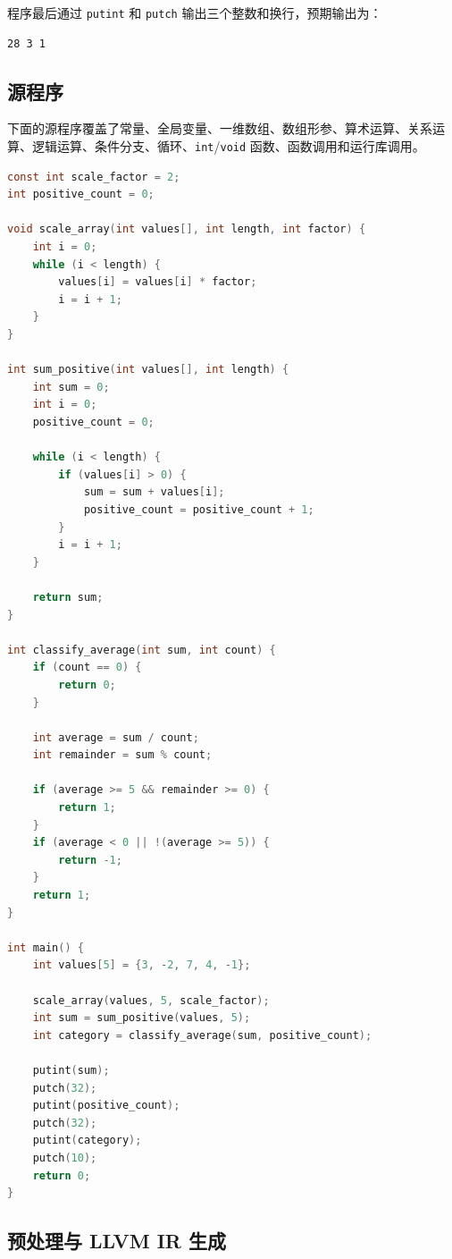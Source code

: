 \documentclass[a4paper]{article}
\begin{document}
程序最后通过 \texttt{putint} 和 \texttt{putch} 输出三个整数和换行，预期输出为：

\begin{lstlisting}[language={},caption={示例程序的预期输出}]
28 3 1
\end{lstlisting}

\subsection{源程序}

下面的源程序覆盖了常量、全局变量、一维数组、数组形参、算术运算、关系运算、逻辑运算、条件分支、循环、\texttt{int}/\texttt{void} 函数、函数调用和运行库调用。

\begin{lstlisting}[language=C,caption={SysY 子集示例程序},label={lst:source}]
const int scale_factor = 2;
int positive_count = 0;

void scale_array(int values[], int length, int factor) {
    int i = 0;
    while (i < length) {
        values[i] = values[i] * factor;
        i = i + 1;
    }
}

int sum_positive(int values[], int length) {
    int sum = 0;
    int i = 0;
    positive_count = 0;

    while (i < length) {
        if (values[i] > 0) {
            sum = sum + values[i];
            positive_count = positive_count + 1;
        }
        i = i + 1;
    }

    return sum;
}

int classify_average(int sum, int count) {
    if (count == 0) {
        return 0;
    }

    int average = sum / count;
    int remainder = sum % count;

    if (average >= 5 && remainder >= 0) {
        return 1;
    }
    if (average < 0 || !(average >= 5)) {
        return -1;
    }
    return 1;
}

int main() {
    int values[5] = {3, -2, 7, 4, -1};

    scale_array(values, 5, scale_factor);
    int sum = sum_positive(values, 5);
    int category = classify_average(sum, positive_count);

    putint(sum);
    putch(32);
    putint(positive_count);
    putch(32);
    putint(category);
    putch(10);
    return 0;
}
\end{lstlisting}

\subsection{预处理与 LLVM IR 生成}
\end{document}

